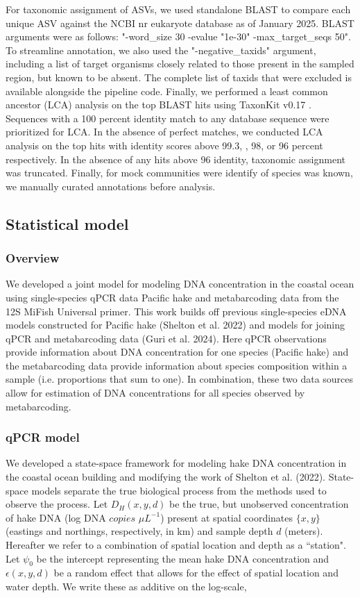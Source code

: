 \documentclass{article}
\begin{document}
For taxonomic assignment of ASVs, we used standalone BLAST \cite{altschul1990} to compare each unique ASV against the NCBI nr eukaryote database as of January 2025. BLAST arguments were as follows: "-word\_size 30 -evalue "1e-30" -max\_target\_seqs 50". To streamline annotation, we also used the "-negative\_taxids" argument, including a list of target organisms closely related to those present in the sampled region, but known to be absent. The complete list of taxids that were excluded is available alongside the pipeline code. Finally, we performed a least common ancestor (LCA) analysis on the top BLAST hits using TaxonKit v0.17 \cite{shen2021}. Sequences with a 100 percent identity match to any database sequence were prioritized for LCA. In the absence of perfect matches, we conducted LCA analysis on the top hits with identity scores above 99.3, , 98, or 96 percent respectively. In the absence of any hits above 96 identity, taxonomic assignment was truncated. Finally, for mock communities were identify of species was known, we manually curated annotations before analysis. 

\subsection*{Statistical model}

\subsubsection*{Overview}

We developed a joint model for modeling DNA concentration in the coastal ocean using single-species qPCR data Pacific hake and metabarcoding data from the 12S MiFish Universal primer. This work builds off previous single-species eDNA models constructed for Pacific hake (Shelton et al. 2022) and models for joining qPCR and metabarcoding data (Guri et al. 2024). Here qPCR observations provide information about DNA concentration for one species (Pacific hake) and the metabarcoding data provide information about species composition within a sample (i.e. proportions that sum to one).  In combination, these two data sources allow for estimation of DNA concentrations for all species observed by metabarcoding.

\subsubsection*{qPCR model}

We developed a state-space framework for modeling hake DNA concentration in the coastal ocean building and modifying the work of Shelton et al. (2022).  State-space models separate the true biological process from the methods used to observe the process. Let $D_H(x,y,d)$ be the true, but unobserved concentration of hake DNA (log DNA $copies$ $\mu L^{-1}$) present at spatial coordinates $\{x,y\}$ (eastings and northings, respectively, in km) and sample depth $d$ (meters). Hereafter we refer to a combination of spatial location and depth as a ``station". Let $\psi_0$ be the intercept representing the mean hake DNA concentration and $\epsilon(x,y,d)$ be a random effect that allows for the effect of spatial location and water depth. We write these as additive on the log-scale,
\end{document}
